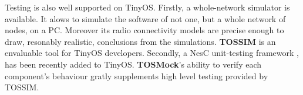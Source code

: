 Testing is also well supported on TinyOS. Firstly, a whole-network
simulator \cite{TOSSIM} is available. It alows to simulate the
software of not one, but a whole network of nodes, on a PC. Moreover
its radio connectivity models are precise enough to draw, resonably
realistic, conclusions from the simulations. {\bf TOSSIM} is an
envaluable tool for TinyOS developers. Secondly, a NesC unit-testing
framework \cite{TOSMock}, has been recently added to TinyOS. {\bf TOSMock}'s
ability to verify each component's behaviour gratly supplements
high level testing provided by TOSSIM.






